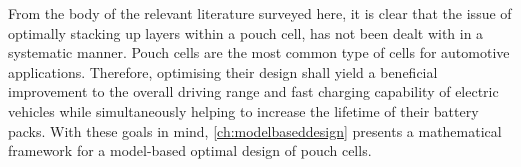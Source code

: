 From the  body of the  relevant literature surveyed here,  it is clear  that the
issue of optimally  stacking up layers within  a pouch cell, has  not been dealt
with in a systematic  manner. Pouch cells are the most common  type of cells for
automotive  applications.  Therefore,  optimising  their design  shall  yield  a
beneficial improvement to the overall driving range and fast charging capability
of electric  vehicles while simultaneously  helping to increase the  lifetime of
their  battery  packs.  With  these goals  in  mind,  \cref{ch:modelbaseddesign}
presents  a mathematical  framework for  a model-based  optimal design  of pouch
cells.


